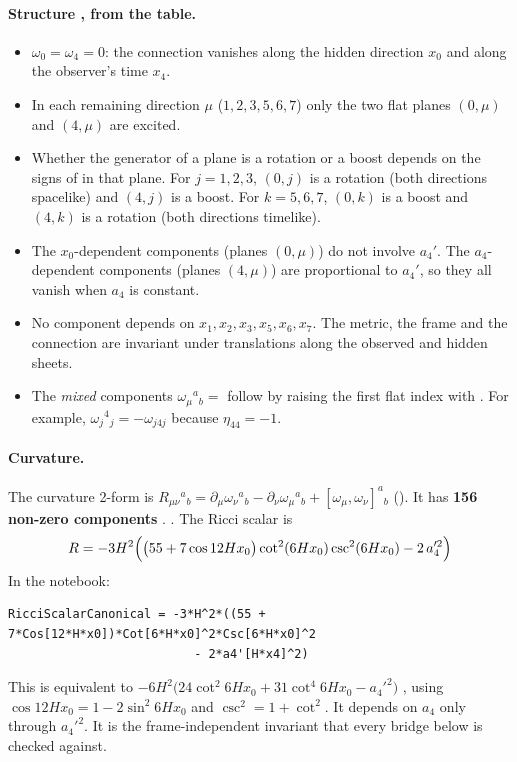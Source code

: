 \paragraph{Structure \cfderived, from the table.}
\begin{itemize}
  \item $\omega_0=\omega_4=0$: the connection vanishes along the hidden direction $x_0$ and along
    the observer's time $x_4$.
  \item In each remaining direction $\mu$ ($1,2,3,5,6,7$) only the two flat planes $(0,\mu)$ and
    $(4,\mu)$ are excited.
  \item Whether the generator of a plane is a rotation or a boost depends on the signs of
     in that plane. For $j=1,2,3$, $(0,j)$ is a rotation (both directions
    spacelike) and $(4,j)$ is a boost. For $k=5,6,7$, $(0,k)$ is a boost and $(4,k)$ is a
    rotation (both directions timelike).
  \item The $x_0$-dependent components (planes $(0,\mu)$) do not involve $a_4'$. The
    $a_4$-dependent components (planes $(4,\mu)$) are proportional to $a_4'$, so they all vanish
    when $a_4$ is constant.
  \item No component depends on $x_1,x_2,x_3,x_5,x_6,x_7$. The metric, the frame and the
    connection are invariant under translations along the observed and hidden sheets.
  \item The \emph{mixed} components $\omega_\mu{}^a{}_b=$  follow by
    raising the first flat index with . For example, $\omega_j{}^4{}_j=-\omega_{j4j}$
    because $\eta_{44}=-1$.
\end{itemize}

\paragraph{Curvature.} The curvature 2-form is
$R_{\mu\nu}{}^a{}_b=\partial_\mu\omega_\nu{}^a{}_b-\partial_\nu\omega_\mu{}^a{}_b+[\omega_\mu,\omega_\nu]^a{}_b$
(). It has \textbf{156 non-zero components} .
 .
The Ricci scalar is 
\begin{equation}
  R=-3H^2\Bigl(\bigl(55+7\cos 12Hx_0\bigr)\cot^2(6Hx_0)\csc^2(6Hx_0)-2\,a_4'^2\Bigr)
\end{equation}
In the notebook:

{\scriptsize
\begin{verbatim}
RicciScalarCanonical = -3*H^2*((55 + 7*Cos[12*H*x0])*Cot[6*H*x0]^2*Csc[6*H*x0]^2
                          - 2*a4'[H*x4]^2)
\end{verbatim}
}
\noindent This is equivalent to $-6H^2\bigl(24\cot^2 6Hx_0+31\cot^4 6Hx_0-a_4'^2\bigr)$ \cfderived, using
$\cos 12Hx_0=1-2\sin^2 6Hx_0$ and $\csc^2=1+\cot^2$. It depends on $a_4$ only through $a_4'^2$. It
is the frame-independent invariant that every bridge below is checked against.

